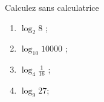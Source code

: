 
\begin{exercice}[\minsyndical]\label{exologarithme-0001}

  Calculez sans calculatrice
  \begin{enumerate}
  \item $\log_{2} 8$ ;
    \item $\log_{10} 10000$ ;
      \item $\displaystyle \log_{4} \frac{1}{16}$ ;
        \item $\log_9 27$;
  \end{enumerate}

\end{exercice}
